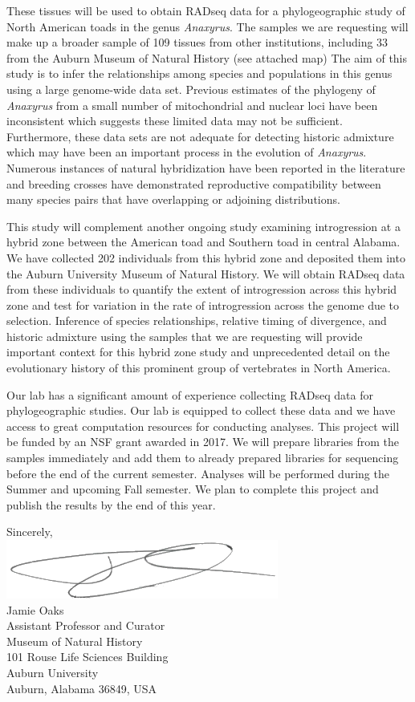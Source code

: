 \documentclass[fontsize=11pt,]{article}
\begin{document}
These tissues will be used to obtain RADseq data for a phylogeographic study of
North American toads in the genus \textit{Anaxyrus}.
The samples we are requesting will make up a broader sample of 109 tissues from 
other institutions, including 33 from the Auburn Museum of Natural History (see attached map)
The aim of this study is to infer the relationships among species and
populations in this genus using a large genome-wide data set.
Previous estimates of the phylogeny of \textit{Anaxyrus} 
from a small number of mitochondrial and nuclear loci have been inconsistent  
which suggests these limited data may not be sufficient.
Furthermore, these data sets are not adequate for detecting historic
admixture which may have been an important process in the evolution of
\textit{Anaxyrus}.
Numerous instances of natural hybridization have been reported in the literature
and breeding crosses have demonstrated reproductive compatibility between many
species pairs that have overlapping or adjoining distributions. \\

\vspace{2mm}

This study will complement another ongoing study examining
introgression at a hybrid zone between the American toad and Southern toad in
central Alabama.
We have collected 202 individuals from this hybrid zone and deposited 
them into the Auburn University Museum of Natural History.
We will obtain RADseq data from these individuals to quantify the extent of
introgression across this hybrid zone and test for variation in the rate of
introgression across the genome due to selection.
Inference of species relationships, relative timing of divergence, and historic
admixture using the samples that we are requesting will provide important
context for this hybrid zone study and unprecedented detail on the evolutionary
history of this prominent group of vertebrates in North America.

\vspace{2mm}

Our lab has a significant amount of experience collecting RADseq data for phylogeographic
studies. Our lab is equipped to collect these data and we have access to great 
computation resources for conducting analyses. This project will be funded by an 
NSF grant awarded in 2017. We will prepare libraries from the samples immediately   
and add them to already prepared libraries for sequencing before the end of the
current semester. Analyses will be performed during the Summer and upcoming Fall 
semester. We plan to complete this project and publish the results by the end of 
this year.

Sincerely,\\

\vspace{2mm}
\includegraphics[height=2.0\baselineskip]{jamie_signature.png}\\

Jamie Oaks\\
Assistant Professor and Curator \\
Museum of Natural History\\
101 Rouse Life Sciences Building\\
Auburn University\\
Auburn, Alabama 36849, USA
\end{document}
